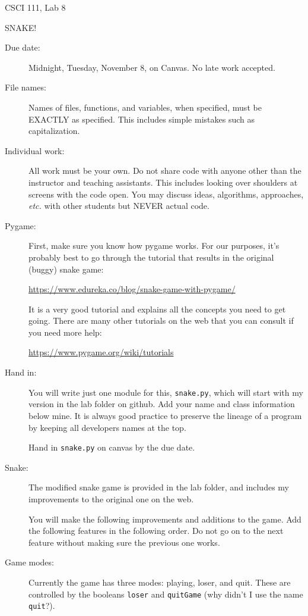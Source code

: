 \documentclass[12pt]{article}
\begin{document}
\sloppy
\centerline{\Large CSCI 111, Lab 8}
\centerline{\large SNAKE!}

\begin{description}
\item[Due date:] Midnight, Tuesday, November 8, on Canvas.
No late work accepted.  

\item[File names:]  Names of files, functions, and variables, 
when specified,
must be EXACTLY as specified.  This includes simple mistakes such
as capitalization.

\item[Individual work:]  All work must be your own.  Do not share
code with anyone other than the instructor and teaching assistants.
This includes looking over shoulders at screens with the code open.
You may discuss ideas, algorithms, approaches, {\em etc.} with
other students but NEVER actual code.

\item[Pygame:]  First, make sure you know how pygame works.
For our purposes, it's probably best to go through the 
tutorial that results in the original (buggy) snake game:

\centerline{\url{https://www.edureka.co/blog/snake-game-with-pygame/}}

It is a very good tutorial and explains all the concepts you need
to get going. There are many other tutorials on the web that you 
can consult if you need more help:
\centerline{ \url{https://www.pygame.org/wiki/tutorials}}


\item[Hand in:]  You will write just one module for this, 
\lstinline{snake.py}, which will start with my version in the
lab folder on github.  Add your name and class information
below mine.  It is always good practice to preserve the 
lineage of a program by keeping all developers names
at the top.  

Hand in \lstinline{snake.py} on canvas by the due date.

\item[Snake:] The modified snake game is provided in the lab folder,
and includes my improvements to the original one on the web.

You will make the following improvements and additions to the game.
Add the following features in the following order.  Do not go on
to the next feature without making sure the previous one works.

\item[Game modes:]  Currently the game has three modes: playing, loser,
and quit.  These are controlled by the booleans \lstinline{loser} and
\lstinline{quitGame} (why didn't I use the name \lstinline{quit}?).


\end{description}
\end{document}
